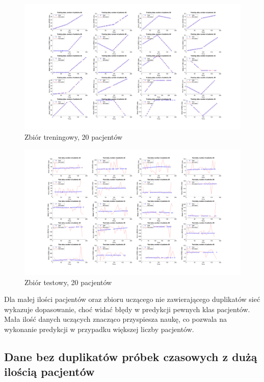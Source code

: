 \documentclass[12pt]{article}
\begin{document}
\begin{figure}[h!]

\centering
\includegraphics[width=1.0\textwidth]{training-cut-20.png}
\caption{Zbiór treningowy, 20 pacjentów}

\end{figure}

\begin{figure}[h!]

\centering
\includegraphics[width=1.1\textwidth]{test-cut-20.png}
\caption{Zbiór testowy, 20 pacjentów}

\end{figure}

\newpage

Dla małej ilości pacjentów oraz zbioru uczącego nie zawierającego duplikatów sieć wykazuje dopasowanie, choć widać błędy w predykcji pewnych klas pacjentów. Mała ilość danych uczących znacząco przyspiesza naukę, co pozwala na wykonanie predykcji w przypadku większej liczby pacjentów.

\subsection{Dane bez duplikatów próbek czasowych z dużą ilością pacjentów}
\end{document}
